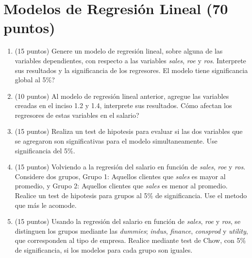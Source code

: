 \documentclass[letterpaper,11pt]{article}
\begin{document}
\section{Modelos de Regresión Lineal (70 puntos)}

\begin{enumerate}

    \item (15 puntos) Genere un modelo de regresión lineal, sobre alguna de las variables dependientes, con respecto a las variables \textit{sales}, \textit{roe} y \textit{ros}. Interprete sus resultados y la significancia de los regresores. \textquestiondown El modelo tiene significancia global al 5\%?



\item (10 puntos) Al modelo de regresión lineal anterior, agregue las variables creadas en el inciso 1.2 y 1.4, interprete sus resultados. \textquestiondown Cómo afectan los regresores de estas variables en el salario?



\item (15 puntos) Realiza un test de hipotesis para evaluar si las dos variables que se agregaron son significativas para el modelo simultaneamente. Use significancia del 5\%.


\item (15 puntos) Volviendo a la regresión del salario en función de \textit{sales}, \textit{roe} y \textit{ros}. Considere dos grupos, Grupo 1: Aquellos clientes que \textit{sales} es mayor al promedio, y Grupo 2: Aquellos clientes que \textit{sales} es menor al promedio. Realice un test de hipotesis para grupos al 5\% de significancia. Use el metodo que más le acomode. 

\item (15 puntos) Usando la regresión del salario en función de \textit{sales}, \textit{roe} y \textit{ros}, se distinguen los grupos mediante las \textit{dummies}; \textit{indus}, \textit{finance}, \textit{consprod} y \textit{utility}, que corresponden al tipo de empresa. Realice mediante test de Chow, con 5\% de significancia, si los modelos para cada grupo son iguales. 


\end{enumerate}
\end{document}
